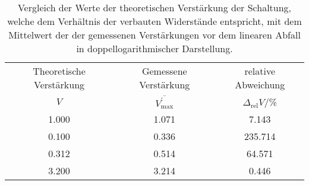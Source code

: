 \begin{table}[!h]
	\centering
	\begin{tabular}{ccc}
		\toprule
		Theoretische Verstärkung & Gemessene Verstärkung & relative Abweichung\\
		$V$ & $\overline{V^{\prime}_{\mathrm{max}}}$ & $\Delta_{\mathrm{rel}} 
		V$/\si{\percent}\\
\midrule
		\num{1.000} & \num{1.071} & \num{7.143}\\
		\num{0.100} & \num{0.336} & \num{235.714}\\
		\num{0.312} & \num{0.514} & \num{64.571}\\
		\num{3.200} & \num{3.214} & \num{0.446}\\
		\bottomrule
	\end{tabular}
	\caption{ Vergleich der Werte der theoretischen Verstärkung der Schaltung, welche dem Verhältnis der verbauten 
Widerstände entspricht, mit dem Mittelwert der der gemessenen Verstärkungen vor dem linearen Abfall in doppellogarithmischer Darstellung. \label{tab:gegengekoppelter_verstaerker_max_verstaerkung}}
\end{table}
